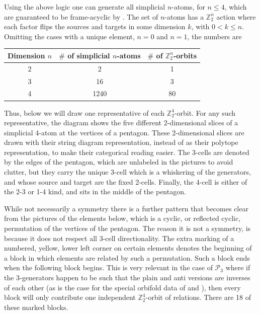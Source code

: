 \documentclass[12pt,a4paper]{article}
\numberwithin{equation}{section}
\begin{document}
Using the above logic one can generate all simplicial $n$-atoms, for $n \leq 4$, which are guaranteed to be frame-acyclic by . The set of $n$-atoms has a $\mathbb{Z}_2^n$ action where each factor flips the sources and targets in some dimension $k$, with $0 < k \leq n$. Omitting the cases with a unique element, $n=0$ and $n=1$, the numbers are
%
\begin{center}
    \begin{tabular}{c|c|c}
        Dimension $n$ & $\#$ of simplicial $n$-atoms & $\#$ of $\mathbb{Z}_2^n$-orbits \\
        \hline
        2 & 2 & 1 \\
        3 & 16 & 3 \\
        4 & 1240 & 80 \\
    \end{tabular}
\end{center}

Thus, below we will draw one representative of each $\mathbb{Z}_2^4$-orbit. For any such representative, the diagram shows the five different 2-dimensional slices of a simplicial 4-atom at the vertices of a pentagon. These 2-dimensional slices are drawn with their string diagram representation, instead of as their polytope representation, to make their categorical reading easier. The 3-cells are denoted by the edges of the pentagon, which are unlabeled in the pictures to avoid clutter, but they carry the unique 3-cell which is a whiskering of the generators, and whose source and target are the fixed 2-cells. Finally, the 4-cell is either of the 2-3 or 1-4 kind, and sits in the middle of the pentagon.

While not necessarily a symmetry there is a further pattern that becomes clear from the pictures of the elements below, which is a cyclic, or reflected cyclic, permutation of the vertices of the pentagon. The reason it is not a symmetry, is because it does not respect all 3-cell directionality. The extra marking of a numbered, yellow, lower left corner on certain elements denotes the beginning of a block in which elements are related by such a permutation. Such a block ends when the following block begins. This is very relevant in the case of $\mathscr{P}_3$ where if the 3-generators happen to be such that the plain and anti versions are inverses of each other (as is the case for the special orbifold data of  and \cite{orbifoldnd,orbifold3d}), then every block will only contribute one independent $\mathbb{Z}_2^4$-orbit of relations. There are 18 of these marked blocks.
\end{document}
